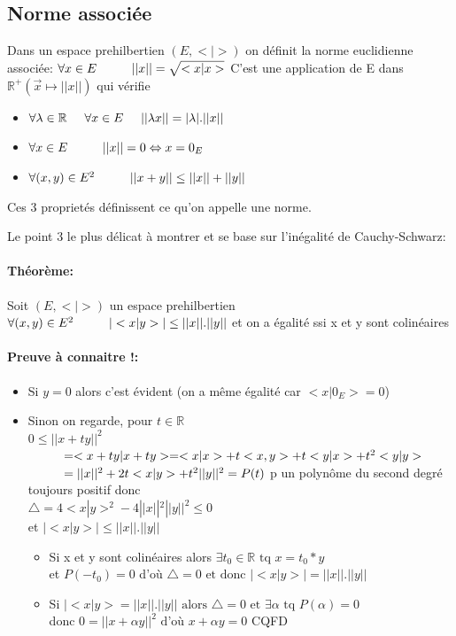 \documentclass{article}
\newcommand\tab[1][1cm]{\hspace*{#1}}
\begin{document}
\subsection{Norme associée}

Dans un espace prehilbertien $(E, <|>)$ on définit la norme euclidienne associée:
$\forall x \in E \tab ||x|| = \sqrt{<x|x>}$
C'est une application de E dans $\mathbb{R}^+ (\vec{x} \longmapsto ||x||)$ qui vérifie
\begin{itemize}
    \item $\forall \lambda \in \mathbb{R} \tab[0.5cm] \forall x \in E \tab[0.5cm] ||\lambda x || = |\lambda|.||x||$
    \item $\forall x \in E \tab ||x|| = 0 \Leftrightarrow x = 0_E$
    \item $\forall(x, y) \in E^2 \tab ||x + y|| \leq ||x|| + ||y||$
\end{itemize}

Ces 3 proprietés définissent ce qu'on appelle une norme.

Le point 3 le plus délicat à montrer et se base sur l'inégalité de Cauchy-Schwarz:

\paragraph{Théorème:}

Soit $(E, <|>)$ un espace prehilbertien \\
$\forall(x, y) \in E^2 \tab |<x|y>| \leq ||x||.||y||$ et on a égalité ssi x et y sont colinéaires

\paragraph{Preuve à connaitre !:}

\begin{itemize}
    \item Si $y = 0$ alors c'est évident (on a même égalité car $<x|0_E> = 0$)
    \item Sinon on regarde, pour $t \in \mathbb{R}$ \\
$0 \leq ||x + ty||^2$ \\
$\tab = <x + ty | x + ty> = <x|x> + t<x,y> + t<y|x> + t^2 <y|y>$ \\
$\tab = ||x||^2 + 2t<x|y> + t^2 ||y||^2 = P(t)$
p un polynôme du second degré toujours positif donc \\
$\bigtriangleup = 4<x | y>^2 - 4||x||^2||y||^2 \leq 0$ \\
et $|<x | y>| \leq ||x||.||y||$
    \begin{itemize}
        \item Si x et y sont colinéaires alors $\exists t_0 \in \mathbb{R} \mbox{ tq } x = t_0 * y$ \\
et $P(-t_0) = 0$ d'où $\bigtriangleup = 0 \mbox{ et donc } |<x | y>| = ||x||.||y||$
        \item Si $|<x | y> = ||x||.||y|| \mbox{ alors } \bigtriangleup = 0 \mbox{ et } \exists \alpha \mbox{ tq } P(\alpha) = 0$ \\
donc $0 = ||x + \alpha y||^2 \mbox{ d'où } x + \alpha y = 0$ CQFD
    \end{itemize}
\end{itemize}
\end{document}
